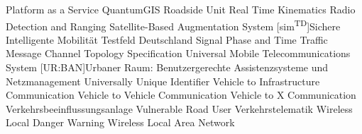  {Platform as a Service}
 {QuantumGIS}
 {Roadside Unit}
 {Real Time Kinematics}
 {Radio Detection and Ranging}
 {Satellite-Based Augmentation System}
[sim\textsuperscript{TD}]{Sichere Intelligente Mobilität Testfeld Deutschland}
 {Signal Phase and Time}
 {Traffic Message Channel}
 {Topology Specification}
 {Universal Mobile Telecommunications System}
[UR:BAN]{Urbaner Raum: Benutzergerechte Assistenzsysteme und Netzmanagement}
 {Universally Unique Identifier}
 {Vehicle to Infrastructure Communication}
 {Vehicle to Vehicle Communication}
 {Vehicle to X Communication}
 {Verkehrsbeeinflussungsanlage}
 {Vulnerable Road User}
 {Verkehrstelematik}
 {Wireless Local Danger Warning}
 {Wireless Local Area Network}
